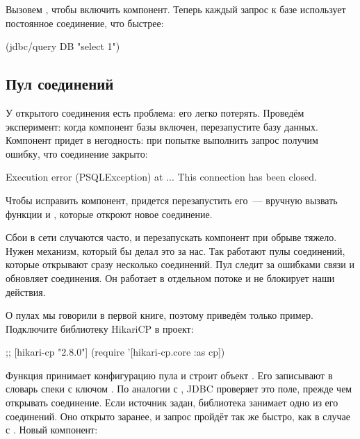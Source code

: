 Вызовем , чтобы включить компонент. Теперь каждый запрос к базе использует постоянное соединение, что быстрее:

\begin{english}
  \begin{clojure}
(jdbc/query DB "select 1")
  \end{clojure}
\end{english}

\subsection{Пул соединений}


У открытого соединения есть проблема: его легко потерять. Проведём эксперимент: когда компонент базы включен, перезапустите базу данных. Компонент придет в негодность: при попытке выполнить запрос получим ошибку, что соединение закрыто:

\begin{english}
  \begin{text}
Execution error (PSQLException) at ...
This connection has been closed.
  \end{text}
\end{english}

Чтобы исправить компонент, придется перезапустить его~--- вручную вызвать функции  и , которые откроют новое соединение.

Сбои в сети случаются часто, и перезапускать компонент при обрыве тяжело. Нужен механизм, который бы делал это за нас. Так работают пулы соединений, которые открывают сразу несколько соединений. Пул следит за ошибками связи и обновляет соединения. Он работает в отдельном потоке и не блокирует наши действия.


О пулах мы говорили в первой книге, поэтому приведём только пример. Подключите библиотеку HikariCP в проект:

\begin{english}
  \begin{clojure}
;; [hikari-cp "2.8.0"]
(require '[hikari-cp.core :as cp])
  \end{clojure}
\end{english}


Функция  принимает конфигурацию пула и строит объект . Его записывают в словарь спеки с ключом . По аналогии с , JDBC проверяет это поле, прежде чем открывать соединение. Если источник задан, библиотека занимает одно из его соединений. Оно открыто заранее, и запрос пройдёт так же быстро, как в случае с . Новый компонент:

